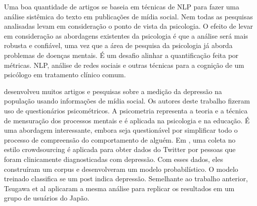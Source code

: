 \documentclass[11pt, notitlepage]{article} %
\begin{document}
Uma boa quantidade de artigos se baseia em técnicas de NLP para fazer uma análise sistêmica do texto em publicações de mídia social. Nem todas as pesquisas analisadas levam em consideração o ponto de vista da psicologia. O efeito de levar em consideração as abordagens existentes da psicologia é que a análise será mais robusta e confiável, uma vez que a área de pesquisa da psicologia já aborda problemas de doenças mentais. É um desafio alinhar a quantificação feita por métricas. NLP, análise de redes sociais e outras técnicas para a cognição de um psicólogo em tratamento clínico comum.

\cite{DeChoudhury:2013:SMM:2464464.2464480} desenvolveu muitos artigos e pesquisas sobre a medição da depressão na população usando informações de mídia social. Os autores deste trabalho fizeram uso de questionários psicométricos.
A psicometria representa a teoria e a técnica de mensuração dos processos mentais e é aplicada na psicologia e na educação. É uma abordagem interessante, embora seja questionável por simplificar todo o processo de compreensão do comportamento de alguém. Em \cite{DeChoudhury:2013:SMM:2464464.2464480}, uma coleta no estilo crowdsourcing é aplicada para obter dados do Twitter por pessoas que foram clinicamente diagnosticadas com depressão. Com esses dados, eles construíram um corpus e desenvolveram um modelo probabilístico. O modelo treinado classifica se um post indica depressão. Semelhante ao trabalho anterior, Tsugawa et al \cite{Tsugawa2015} aplicaram a mesma análise para replicar os resultados em um grupo de usuários do Japão.
\end{document}
